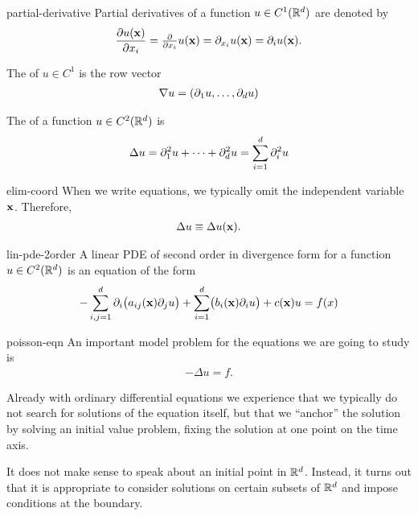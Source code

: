 \begin{Notation}{partial-derivative}
  Partial derivatives of a function $u\in C^1(\mathbb R^d)$ are denoted by
  \begin{gather*}
    \frac{\partial u(\mathbf x)}{\partial x_i} = \tfrac{\partial}{\partial x_i} u(\mathbf x)
    = \partial_{x_i} u(\mathbf x) = \partial_i u(\mathbf x).
  \end{gather*}

  The  of $u \in C^1$ is the row vector
  \begin{gather*}
    \nabla u = (\partial_1u,\dots,\partial_du)
  \end{gather*}

  The  of a function $u\in C^2(\mathbb R^d)$ is
  \begin{gather*}
    \Delta u = \partial_1^2 u + \dots + \partial_d^2 u = \sum_{i=1}^d \partial_i^2 u
  \end{gather*}
\end{Notation}

\begin{Notation}{elim-coord}
  When we write equations, we typically omit the independent variable
  $\mathbf x$. Therefore,
  \begin{gather*}
    \Delta u \equiv \Delta u(\mathbf x).
  \end{gather*}
\end{Notation}

\begin{Definition}{lin-pde-2order}
  A linear PDE of second order in divergence form for a function
  $u\in C^2(\mathbb R^d)$ is an equation of the form
  \begin{gather}
    -\sum_{i,j=1}^d \partial_i \bigl(a_{ij}(\mathbf x) \partial_j u\bigr)
    + \sum_{i=1}^d \bigl(b_i(\mathbf x) \partial_i u\bigr) + c(\mathbf x) u = f(x)
  \end{gather}
\end{Definition}

\begin{Definition}{poisson-eqn}
  An important model problem for the equations we are going to study
  is 
  \begin{gather}
    \label{eq:Poisson}
    -\Delta u = f.
  \end{gather}
\end{Definition}

\begin{intro}
  Already with ordinary differential equations we experience that we
  typically do not search for solutions of the equation itself, but
  that we ``anchor'' the solution by solving an initial value problem,
  fixing the solution at one point on the time axis.

  It does not make sense to speak about an initial point in
  $\mathbb R^d$. Instead, it turns out that it is appropriate to consider
  solutions on certain subsets of $\mathbb R^d$ and impose conditions at the
  boundary.
\end{intro}

